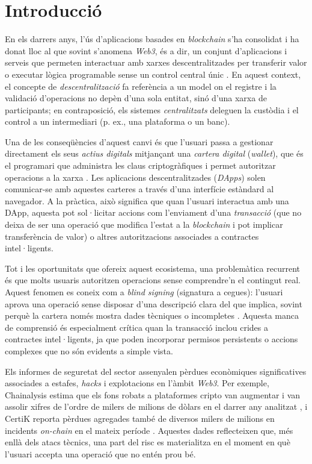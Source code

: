 \section{Introducció}
\label{cap:introduction}

En els darrers anys, l’ús d’aplicacions basades en \textit{blockchain} s’ha consolidat i ha donat lloc al que sovint s’anomena \textit{Web3}, és a dir, un conjunt d’aplicacions i serveis que permeten interactuar amb xarxes descentralitzades per transferir valor o executar lògica programable sense un control central únic \cite{ethereum_whitepaper,chainalysis_2024_trends}. En aquest context, el concepte de \textit{descentralització} fa referència a un model on el registre i la validació d’operacions no depèn d’una sola entitat, sinó d’una xarxa de participants; en contraposició, els sistemes \textit{centralitzats} deleguen la custòdia i el control a un intermediari (p. ex., una plataforma o un banc).

Una de les conseqüències d’aquest canvi és que l’usuari passa a gestionar directament els seus \textit{actius digitals} mitjançant una \textit{cartera digital} (\textit{wallet}), que és el programari que administra les claus criptogràfiques i permet autoritzar operacions a la xarxa \cite{ethereum_whitepaper}. Les aplicacions descentralitzades (\textit{DApps}) solen comunicar-se amb aquestes carteres a través d’una interfície estàndard al navegador. A la pràctica, això significa que quan l’usuari interactua amb una DApp, aquesta pot sol·licitar accions com l’enviament d’una \textit{transacció} (que no deixa de ser una operació que modifica l’estat a la \textit{blockchain} i pot implicar transferència de valor) o altres autoritzacions associades a contractes intel·ligents.

Tot i les oportunitats que ofereix aquest ecosistema, una problemàtica recurrent és que molts usuaris autoritzen operacions sense comprendre’n el contingut real. Aquest fenomen es coneix com a \textit{blind signing} (signatura a cegues): l’usuari aprova una operació sense disposar d’una descripció clara del que implica, sovint perquè la cartera només mostra dades tècniques o incompletes \cite{coinbase_blind_signing,ledger_blind_signing}. Aquesta manca de comprensió és especialment crítica quan la transacció inclou crides a contractes intel·ligents, ja que poden incorporar permisos persistents o accions complexes que no són evidents a simple vista.

Els informes de seguretat del sector assenyalen pèrdues econòmiques significatives associades a estafes, \textit{hacks} i explotacions en l’àmbit \textit{Web3}. Per exemple, Chainalysis estima que els fons robats a plataformes cripto van augmentar i van assolir xifres de l’ordre de milers de milions de dòlars en el darrer any analitzat \cite{chainalysis_stolen_2024,chainalysis_2025_report_intro}, i CertiK reporta pèrdues agregades també de diversos milers de milions en incidents \textit{on-chain} en el mateix període \cite{certik_hack3d_2024}. Aquestes dades reflecteixen que, més enllà dels atacs tècnics, una part del risc es materialitza en el moment en què l’usuari accepta una operació que no entén prou bé.

